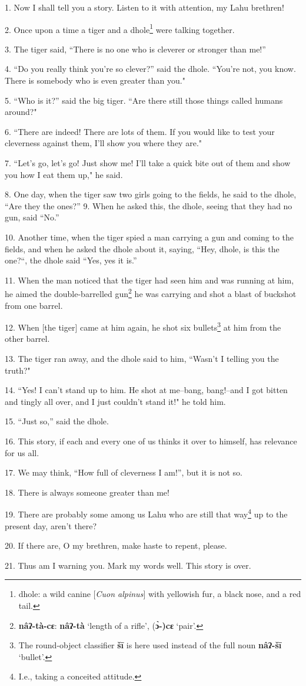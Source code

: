 \setcounter{footnote}{0}


1. Now I shall tell you a story. Listen to it with attention, my Lahu brethren!

2. Once upon a time a tiger and a dhole\footnote{dhole: a wild canine [\textit{Cuon alpinus}] with yellowish fur, a black nose, and a red tail.} were talking together.

3. The tiger said, ``There is no one who is cleverer or stronger than me!''

4. ``Do you really think you're so clever?'' said the dhole. ``You're
not, you know. There is somebody who is even greater than you."

5. ``Who is it?'' said the big tiger. ``Are there still
those things called humans around?"

6. ``There are indeed! There are lots of them. If you would like to test
your cleverness against them, I'll show you where they are."

7. ``Let's go, let's go! Just show me! I'll take a quick bite out of them
and show you how I eat them up," he said.

8. One day, when the tiger saw two girls going to the fields, he said to the dhole,
``Are they the ones?'' 9. When he asked this, the dhole, seeing
that they had no gun, said ``No.''

10. Another time, when the tiger spied a man carrying a gun and coming to the fields,
and when he asked the dhole about it, saying, ``Hey, dhole, is this the
one?``, the dhole said ``Yes, yes it is.''

11. When the man noticed that the tiger had seen him and was running at him, he
aimed the double-barrelled gun\footnote{\textbf{nâʔ-tà-cɛ}: \textbf{nâʔ-tà} `length of a rifle', (\textbf{ɔ̀-)cɛ} `pair'.} he was carrying and shot a blast of buckshot
from one barrel.

12. When [the tiger] came at him again, he shot six bullets\footnote{The round-object classifier \textbf{šī} is here used instead of the full noun \textbf{nâʔ-šī} `bullet'.} at him from the
other barrel.

13. The tiger ran away, and the dhole said to him, ``Wasn't I telling you
the truth?"

14. ``Yes! I can't stand up to him. He shot at me--bang, bang!--and I got
bitten and tingly all over, and I just couldn't stand it!" he told him.

15. ``Just so,'' said the dhole.

16. This story, if each and every one of us thinks it over to himself, has relevance
for us all.

17. We may think, ``How full of cleverness I am!'', but it is not
so.

18. There is always someone greater than me!

19. There are probably some among us Lahu who are still that way\footnote{I.e., taking a conceited attitude.} up to the
present day, aren't there?

20. If there are, O my brethren, make haste to repent, please.

21. Thus am I warning you. Mark my words well. This story is over.


